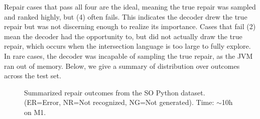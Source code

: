 \noindent Repair cases that pass all four are the ideal, meaning the true repair was sampled and ranked highly, but (4) often fails. This indicates the decoder drew the true repair but was not discerning enough to realize its importance. Cases that fail (2) mean the decoder had the opportunity to, but did not actually draw the true repair, which occurs when the intersection language is too large to fully explore. In rare cases, the decoder was incapable of sampling the true repair, as the JVM ran out of memory. Below, we give a summary of distribution over outcomes across the test set.

\begin{figure}[H]
\begin{center}
\resizebox{.73\textwidth}{!}{}
\caption{Summarized repair outcomes from the SO Python dataset. (ER=Error, NR=Not recognized, NG=Not generated). Time: $\sim$10h on M1.}
\end{center}
\end{figure}
